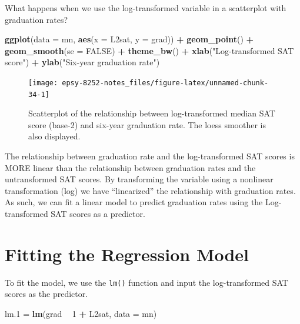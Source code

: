 \documentclass[]{book}
\newenvironment{Shaded}{\begin{snugshade}}{\end{snugshade}}
\newcommand{\DataTypeTok}[1]{\textcolor[rgb]{0.13,0.29,0.53}{#1}}
\newcommand{\DecValTok}[1]{\textcolor[rgb]{0.00,0.00,0.81}{#1}}
\newcommand{\FloatTok}[1]{\textcolor[rgb]{0.00,0.00,0.81}{#1}}
\newcommand{\KeywordTok}[1]{\textcolor[rgb]{0.13,0.29,0.53}{\textbf{#1}}}
\newcommand{\NormalTok}[1]{#1}
\newcommand{\OperatorTok}[1]{\textcolor[rgb]{0.81,0.36,0.00}{\textbf{#1}}}
\newcommand{\OtherTok}[1]{\textcolor[rgb]{0.56,0.35,0.01}{#1}}
\newcommand{\StringTok}[1]{\textcolor[rgb]{0.31,0.60,0.02}{#1}}
\begin{document}
What happens when we use the log-transformed variable in a scatterplot with graduation rates?

\begin{Shaded}
\begin{Highlighting}[]
\KeywordTok{ggplot}\NormalTok{(}\DataTypeTok{data =}\NormalTok{ mn, }\KeywordTok{aes}\NormalTok{(}\DataTypeTok{x =}\NormalTok{ L2sat, }\DataTypeTok{y =}\NormalTok{ grad)) }\OperatorTok{+}
\StringTok{  }\KeywordTok{geom_point}\NormalTok{() }\OperatorTok{+}
\StringTok{  }\KeywordTok{geom_smooth}\NormalTok{(}\DataTypeTok{se =} \OtherTok{FALSE}\NormalTok{) }\OperatorTok{+}
\StringTok{  }\KeywordTok{theme_bw}\NormalTok{() }\OperatorTok{+}
\StringTok{  }\KeywordTok{xlab}\NormalTok{(}\StringTok{"Log-transformed SAT score"}\NormalTok{) }\OperatorTok{+}
\StringTok{  }\KeywordTok{ylab}\NormalTok{(}\StringTok{"Six-year graduation rate"}\NormalTok{)}
\end{Highlighting}
\end{Shaded}

\begin{figure}

{\centering \texttt{[image: epsy-8252-notes\_files/figure-latex/unnamed-chunk-34-1]} 

}

\caption{Scatterplot of the relationship between log-transformed median SAT score (base-2) and six-year graduation rate. The loess smoother is also displayed.}\label{fig:unnamed-chunk-34}
\end{figure}

The relationship between graduation rate and the log-transformed SAT scores is MORE linear than the relationship between graduation rates and the untransformed SAT scores. By transforming the variable using a nonlinear transformation (log) we have ``linearized'' the relationship with graduation rates. As such, we can fit a linear model to predict graduation rates using the Log-transformed SAT scores as a predictor.

\hypertarget{fitting-the-regression-model}{%
\section{Fitting the Regression Model}\label{fitting-the-regression-model}}

To fit the model, we use the \texttt{lm()} function and input the log-transformed SAT scores as the predictor.

\begin{Shaded}
\begin{Highlighting}[]
\NormalTok{lm}\FloatTok{.1}\NormalTok{ =}\StringTok{ }\KeywordTok{lm}\NormalTok{(grad }\OperatorTok{~}\StringTok{ }\DecValTok{1} \OperatorTok{+}\StringTok{ }\NormalTok{L2sat, }\DataTypeTok{data =}\NormalTok{ mn)}
\end{Highlighting}
\end{Shaded}
\end{document}
